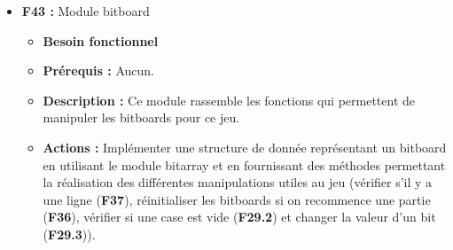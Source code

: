 \documentclass{article}
\begin{document}
\begin{itemize}
\begin{itemize}
        \item \textbf{Actions :} Créer une structure de données représentant le joueur courant par un 0 ou un 1, la structure qui contient et manipule les temps des joueurs, la structure contenant l’état du plateau, la structure contenant l’historique des tours joués et la configuration qui représente les informations du fichier de configuration et les options passées en arguments du programme. On doit pouvoir récupérer les différents composants afin de les manipuler pour le fonctionnement du jeu.
        \item \textbf{F44.1 :} Module game \label{game_state}
        \begin{itemize}
            \item \textbf{Description :} Structure game et fonctions associées :
            \begin{itemize}
                \item joueur courant
                \item plateau de jeu - bitboards
                \item couple d’historiques
                \item structure configuration
            \end{itemize}
            \item \textbf{Prérequis :} Plateau de jeu (\textbf{F42}), module bitboard (\textbf{F43}).
            \item \textbf{Actions :} Constructeur + getters de chacun des attributs + setters configuration + méthodes pour passer au tour ou au joueur suivant ou précédent.
            \item \textbf{Tests :} Vérifier les valeurs de retour des getters, les valeurs des modifications des setters et l’état de la structure obtenue à partir du constructeur.
        \end{itemize}
    \end{itemize}
\bigskip
    \item \textbf{F43 :} Module bitboard \label{bitboard}
    \begin{itemize}
        \item \textbf{Besoin fonctionnel}
        \item \textbf{Prérequis :} Aucun.
        \item \textbf{Description :} Ce module rassemble les fonctions qui permettent de manipuler les bitboards pour ce jeu.
        \item \textbf{Actions :} Implémenter une structure de donnée représentant un bitboard en utilisant le module bitarray et en fournissant des méthodes permettant la réalisation des différentes manipulations utiles au jeu (vérifier s'il y a une ligne (\textbf{F37}), réinitialiser les bitboards si on recommence une partie (\textbf{F36}), vérifier si une case est vide (\textbf{F29.2}) et changer la valeur d'un bit (\textbf{F29.3})).

\end{itemize}
\end{itemize}
\end{document}
